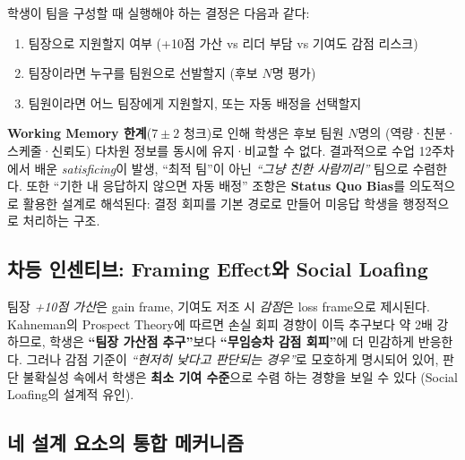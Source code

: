\documentclass[a4paper,11pt]{article}
\begin{document}
\noindent
학생이 팀을 구성할 때 실행해야 하는 결정은 다음과 같다:

\begin{enumerate}[leftmargin=1.5em, itemsep=1pt]
  \item 팀장으로 지원할지 여부 (+10점 가산 vs 리더 부담 vs 기여도 감점 리스크)
  \item 팀장이라면 누구를 팀원으로 선발할지 (후보 $N$명 평가)
  \item 팀원이라면 어느 팀장에게 지원할지, 또는 자동 배정을 선택할지
\end{enumerate}

\textbf{Working Memory 한계}($7\pm2$ 청크)로 인해 학생은 후보 팀원 $N$명의
(역량·친분·스케줄·신뢰도) 다차원 정보를 동시에 유지·비교할 수 없다. 결과적으로
수업 12주차에서 배운 \textit{satisficing}이 발생, ``최적 팀''이 아닌
\textit{``그냥 친한 사람끼리''} 팀으로 수렴한다. 또한 ``기한 내 응답하지 않으면 자동
배정'' 조항은 \textbf{Status Quo Bias}를 의도적으로 활용한 설계로 해석된다: 결정
회피를 기본 경로로 만들어 미응답 학생을 행정적으로 처리하는 구조.

\subsection{차등 인센티브: Framing Effect와 Social Loafing}

팀장 \textit{+10점 가산}은 gain frame, 기여도 저조 시 \textit{감점}은 loss frame으로
제시된다. Kahneman의 Prospect Theory에 따르면 손실 회피 경향이 이득 추구보다 약
2배 강하므로, 학생은 \textbf{``팀장 가산점 추구''}보다 \textbf{``무임승차 감점 회피''}에
더 민감하게 반응한다. 그러나 감점 기준이 \textit{``현저히 낮다고 판단되는 경우''}로
모호하게 명시되어 있어, 판단 불확실성 속에서 학생은 \textbf{최소 기여 수준}으로 수렴
하는 경향을 보일 수 있다 (Social Loafing의 설계적 유인).

\subsection{네 설계 요소의 통합 메커니즘}
\end{document}
